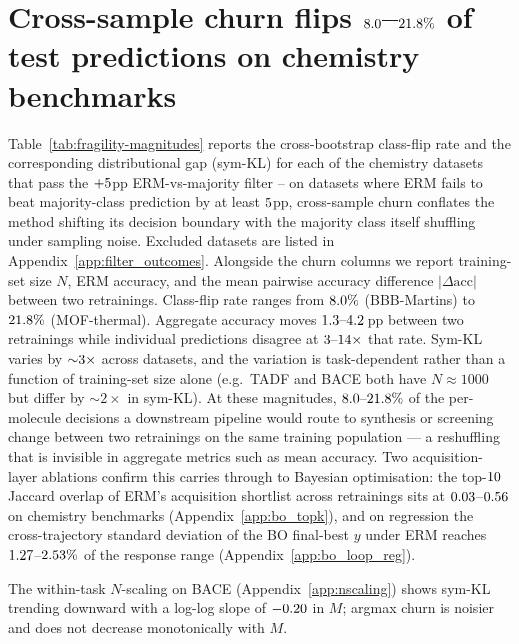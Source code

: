 \section{\boldmath Cross-sample churn flips $8.0$--$21.8\%$ of test predictions on \nDatasetsHeadline{} chemistry benchmarks}
\label{sec:churn-magnitudes}

Table~\ref{tab:fragility-magnitudes} reports the cross-bootstrap
class-flip rate and the corresponding distributional gap (sym-KL)
for each of the \nDatasetsHeadline{} chemistry datasets that pass the
$+5$pp ERM-vs-majority filter -- on datasets where ERM
fails to beat majority-class prediction by at least
$5$pp, cross-sample churn conflates the method shifting
its decision boundary with the majority class itself shuffling under
sampling noise.  Excluded datasets are listed in
Appendix~\ref{app:filter_outcomes}.  Alongside the churn columns we
report training-set size $N$, ERM accuracy, and the mean pairwise
accuracy difference $|\Delta\text{acc}|$ between two retrainings.  Class-flip rate ranges from $8.0\%$ (BBB-Martins)
to $21.8\%$ (MOF-thermal).  Aggregate accuracy moves
$1.3\text{--}4.2$\,pp between two retrainings while
individual predictions disagree at
$3\text{--}14\times$ that rate.
Sym-KL varies by ${\sim}3\times$ across datasets,
and the variation is task-dependent rather than a function of
training-set size alone (e.g.\ TADF and BACE both have
$N \approx 1000$ but differ by ${\sim}2\times$ in sym-KL).
At these magnitudes, $8.0\text{--}21.8\%$ of the
per-molecule decisions a downstream pipeline would route to
synthesis or screening change between two retrainings on the same
training population --- a reshuffling that is invisible in
aggregate metrics such as mean accuracy.  Two acquisition-layer ablations confirm this carries through to
Bayesian optimisation: the top-$10$ Jaccard overlap of ERM's
acquisition shortlist across retrainings sits at
$0.03$--$0.56$ on chemistry
benchmarks (Appendix~\ref{app:bo_topk}), and on regression the
cross-trajectory standard deviation of the BO final-best $y$ under
ERM reaches $1.27$--$2.53\%$
of the response range (Appendix~\ref{app:bo_loop_reg}).



The within-task $N$-scaling on BACE (Appendix~\ref{app:nscaling})
shows sym-KL trending downward with a log-log slope of
$-0.20$ in $M$; argmax churn is noisier and does not
decrease monotonically with $M$.

